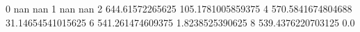 0 nan nan
1 nan nan
2 644.61572265625 105.1781005859375
4 570.5841674804688 31.14654541015625
6 541.261474609375 1.8238525390625
8 539.4376220703125 0.0

